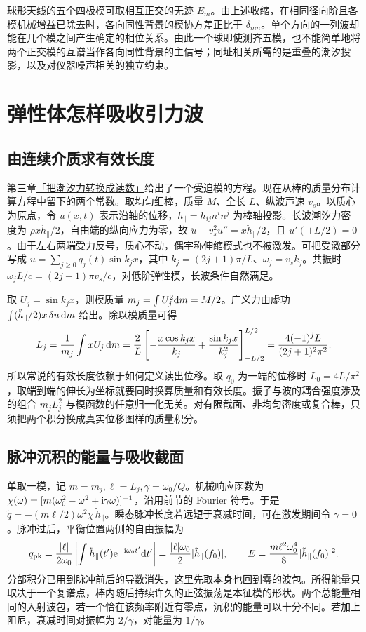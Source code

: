 球形天线的五个四极模可取相互正交的无迹 $E_m$。由上述收缩，在相同径向阶且各模机械增益已除去时，各向同性背景的模协方差正比于 $\delta_{mn}$。单个方向的一列波却能在几个模之间产生确定的相位关系。由此一个球即使测齐五模，也不能简单地将两个正交模的互谱当作各向同性背景的主信号；同址相关所需的是重叠的潮汐投影，以及对仪器噪声相关的独立约束。

\section{弹性体怎样吸收引力波}\label{sec:gw-b-bar}
\subsection{由连续介质求有效长度}
第三章\hyperlink{subsection.3.12.11}{「把潮汐力转换成读数」}给出了一个受迫模的方程。现在从棒的质量分布计算方程中留下的两个常数。取均匀细棒，质量 $M$、全长 $L$、纵波声速 $v_s$。以质心为原点，令 $u(x,t)$ 表示沿轴的位移，$h_\parallel=h_{ij}n^in^j$ 为棒轴投影。长波潮汐力密度为 $\rho x\ddot h_\parallel/2$，自由端的纵向应力为零，故 $\ddot u-v_s^2u''=x\ddot h_\parallel/2$，且 $u'(\pm L/2)=0$。由于左右两端受力反号，质心不动，偶宇称伸缩模式也不被激发。可把受激部分写成 $u=\sum_{j\ge0}q_j(t)\sin k_jx$，其中 $k_j=(2j+1)\pi/L$、$\omega_j=v_sk_j$。共振时 $\omega_jL/c=(2j+1)\pi v_s/c$，对低阶弹性模，长波条件自然满足。

取 $U_j=\sin k_jx$，则模质量 $m_j=\int U_j^2\dd m=M/2$。广义力由虚功 $\int (\ddot h_\parallel/2)x\,\delta u\,\dd m$ 给出。除以模质量可得
\[
 L_j=\frac{1}{m_j}\int xU_j\,\dd m
 =\frac{2}{L}\left[-\frac{x\cos k_jx}{k_j}
             +\frac{\sin k_jx}{k_j^2}\right]_{-L/2}^{L/2}
 =\frac{4(-1)^j L}{(2j+1)^2\pi^2}.
\]
所以常说的有效长度依赖于如何定义读出位移。取 $q_0$ 为一端的位移时 $L_0=4L/\pi^2$，取端到端的伸长为坐标就要同时换算质量和有效长度。振子与波的耦合强度涉及的组合 $m_jL_j^2$ 与模函数的任意归一化无关。对有限截面、非均匀密度或复合棒，只须把两个积分换成真实位移图样的质量积分。

\subsection{脉冲沉积的能量与吸收截面}
单取一模，记 $m=m_j,\ell=L_j,\gamma=\omega_0/Q$。机械响应函数为 $\chi(\omega)=[m(\omega_0^2-\omega^2+\mathrm{i}\gamma\omega)]^{-1}$，沿用前节的 Fourier 符号。于是 $\tilde q=-(m\ell/2)\omega^2\chi\,\tilde h_\parallel$。瞬态脉冲长度若远短于衰减时间，可在激发期间令 $\gamma=0$。脉冲过后，平衡位置两侧的自由振幅为
\[
 q_{\rm pk}=\frac{|\ell|}{2\omega_0}
 \left|\int \ddot h_\parallel(t')\mathrm{e}^{-\mathrm{i}\omega_0t'}\dd t'\right|
 =\frac{|\ell|\omega_0}{2}|\tilde h_\parallel(f_0)|,\qquad
 E=\frac{m\ell^2\omega_0^4}{8}|\tilde h_\parallel(f_0)|^2 .
\]
分部积分已用到脉冲前后的导数消失，这里先取本身也回到零的波包。所得能量只取决于一个复谱点，棒内随后持续许久的正弦振荡是本征模的形状。两个总能量相同的入射波包，若一个恰在该频率附近有零点，沉积的能量可以十分不同。若加上阻尼，衰减时间对振幅为 $2/\gamma$，对能量为 $1/\gamma$。

